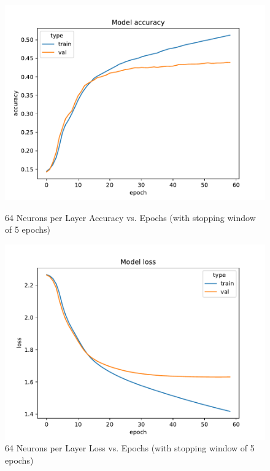 \documentclass{article}
\begin{document}


    \begin{figure}[H]
        \begin{minipage}[b]{0.5\linewidth}
            \centering
            \includegraphics[width=\textwidth]{../plots/config_2f_half_accuracy}
            \caption{64 Neurons per Layer Accuracy vs. Epochs (with stopping window of 5 epochs)}
            \label{fig:figure15}
        \end{minipage}
        \hspace{0.2cm}
        \begin{minipage}[b]{0.5\linewidth}
            \centering
            \includegraphics[width=\textwidth]{../plots/config_2f_half_loss}
            \caption{64 Neurons per Layer Loss vs. Epochs (with stopping window of 5 epochs)}
            \label{fig:figure16}
        \end{minipage}
    \end{figure}
\end{document}
